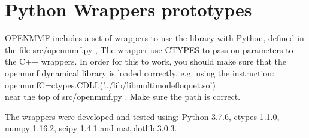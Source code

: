 \documentclass[10pt,a4paper]{article}
\begin{document}
\section{Python Wrappers prototypes}

OPENMMF includes a set of wrappers to use the library with Python, defined in the file   src/openmmf.py  , The wrapper use CTYPES to pass on parameters to the C++ wrappers. In order for this to work, you should make sure that the openmmf dynamical library is loaded correctly, e.g. using the instruction:\\
openmmfC=ctypes.CDLL('../lib/libmultimodefloquet.so')\\
near the top of   src/openmmf.py . Make sure the path is correct.

The wrappers were developed and tested using: Python 3.7.6, ctypes 1.1.0, numpy 1.16.2, scipy 1.4.1 and matplotlib 3.0.3.
\end{document}
